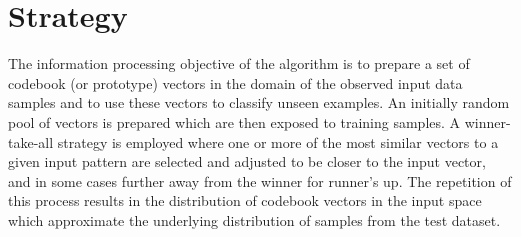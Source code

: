 \documentclass[a4paper, 11pt]{article}
\begin{document}

\section{Strategy}
\label{sec:strategy}
The information processing objective of the algorithm is to prepare a set of codebook (or prototype) vectors in the domain of the observed input data samples and to use these vectors to classify unseen examples.
An initially random pool of vectors is prepared which are then exposed to training samples. A winner-take-all strategy is employed where one or more of the most similar vectors to a given input pattern are selected and adjusted to be closer to the input vector, and in some cases further away from the winner for runner's up. The repetition of this process results in the distribution of codebook vectors in the input space which approximate the underlying distribution of samples from the test dataset.
\end{document}
